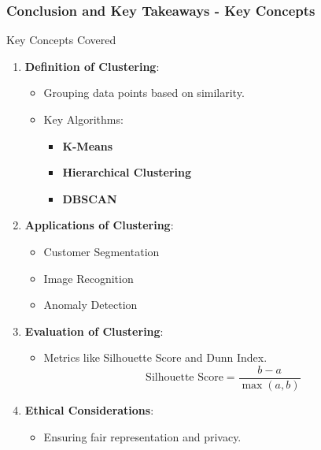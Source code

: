 \documentclass[aspectratio=169]{beamer}
\begin{document}
\begin{frame}[fragile]
  \frametitle{Conclusion and Key Takeaways - Key Concepts}
  \begin{block}{Key Concepts Covered}
    \begin{enumerate}
      \item \textbf{Definition of Clustering}:
        \begin{itemize}
          \item Grouping data points based on similarity.
          \item Key Algorithms:
            \begin{itemize}
              \item \textbf{K-Means}
              \item \textbf{Hierarchical Clustering}
              \item \textbf{DBSCAN}
            \end{itemize}
        \end{itemize}

      \item \textbf{Applications of Clustering}:
        \begin{itemize}
          \item Customer Segmentation
          \item Image Recognition
          \item Anomaly Detection
        \end{itemize}
      
      \item \textbf{Evaluation of Clustering}:
        \begin{itemize}
          \item Metrics like Silhouette Score and Dunn Index.
          \begin{equation}
            \text{Silhouette Score} = \frac{b - a}{\max(a, b)}
          \end{equation}
        \end{itemize}

      \item \textbf{Ethical Considerations}:
        \begin{itemize}
          \item Ensuring fair representation and privacy.
        \end{itemize}
    \end{enumerate}
  \end{block}
\end{frame}
\end{document}
